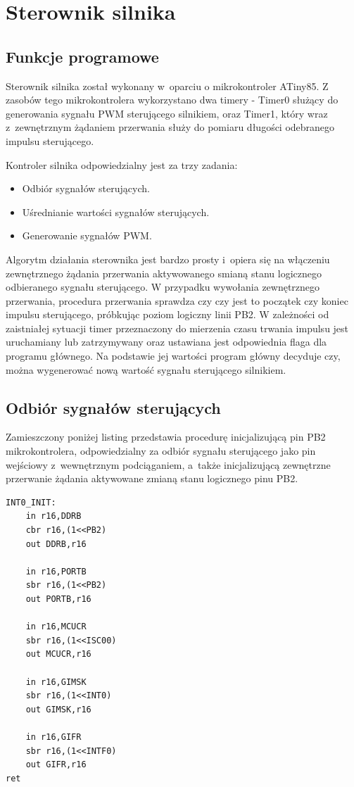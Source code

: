 \documentclass[11pt, twoside]{Thesis} %
\begin{document}
\section{Sterownik silnika}
\subsection{Funkcje programowe}
Sterownik silnika został wykonany w~oparciu o mikrokontroler ATiny85. Z zasobów tego mikrokontrolera wykorzystano dwa timery - Timer0 służący do generowania sygnału PWM sterującego silnikiem, oraz Timer1, który wraz z~zewnętrznym żądaniem przerwania służy do pomiaru długości odebranego impulsu sterującego.

Kontroler silnika odpowiedzialny jest za trzy zadania:
\begin{itemize}
	\item Odbiór sygnałów sterujących.
	\item Uśrednianie wartości sygnałów sterujących.
	\item Generowanie sygnałów PWM.
\end{itemize}

Algorytm działania sterownika jest bardzo prosty i~opiera się na włączeniu zewnętrznego żądania przerwania aktywowanego smianą stanu logicznego odbieranego sygnału sterującego. W przypadku wywołania zewnętrznego przerwania, procedura przerwania sprawdza czy czy jest to początek czy koniec impulsu sterującego, próbkując poziom logiczny linii PB2. W zależności od zaistniałej sytuacji timer przeznaczony do mierzenia czasu trwania impulsu jest uruchamiany lub zatrzymywany oraz ustawiana jest odpowiednia flaga dla programu głównego. Na podstawie jej wartości program główny decyduje czy, można wygenerować nową wartość sygnału sterującego silnikiem.


\subsection{Odbiór sygnałów sterujących}

Zamieszczony poniżej listing przedstawia procedurę inicjalizującą pin PB2 mikrokontrolera, odpowiedzialny za odbiór sygnału sterującego jako pin wejściowy z~wewnętrznym podciąganiem, a~także inicjalizującą zewnętrzne przerwanie żądania aktywowane zmianą stanu logicznego pinu PB2. 

\begin{lstlisting}
INT0_INIT:
	in r16,DDRB
	cbr r16,(1<<PB2)
	out DDRB,r16	

	in r16,PORTB
	sbr r16,(1<<PB2)
	out PORTB,r16

	in r16,MCUCR
	sbr r16,(1<<ISC00)
	out MCUCR,r16

	in r16,GIMSK
	sbr r16,(1<<INT0)
	out GIMSK,r16

	in r16,GIFR
	sbr r16,(1<<INTF0)
	out GIFR,r16
ret
\end{lstlisting}
\end{document}

